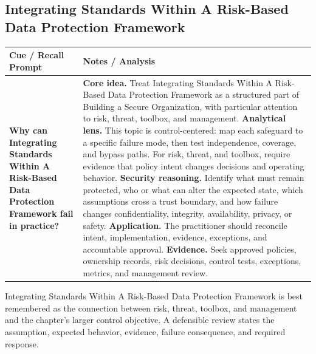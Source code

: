 \documentclass[11pt]{article}
\newcommand{\CornellHeader}{%
\rowcolor{Navy}\color{white}\bfseries Cue / Recall Prompt & \color{white}\bfseries Notes / Analysis\\\hline}
\newcommand{\CornellRow}[2]{%
\cellcolor{CueGray}\RaggedRight\textbf{#1} & \RaggedRight #2\\\hline}
\begin{document}
\subsection*{Integrating Standards Within A Risk-Based Data Protection Framework}
\begin{longtable}{>{\RaggedRight\arraybackslash}p{}|>{\RaggedRight\arraybackslash}p{}}
\CornellHeader
\CornellRow{Why can Integrating Standards Within A Risk-Based Data Protection Framework fail in practice?}{\textbf{Core idea.} Treat Integrating Standards Within A Risk-Based Data Protection Framework as a structured part of Building a Secure Organization, with particular attention to risk, threat, toolbox, and management. \textbf{Analytical lens.} This topic is control-centered: map each safeguard to a specific failure mode, then test independence, coverage, and bypass paths. For risk, threat, and toolbox, require evidence that policy intent changes decisions and operating behavior. \textbf{Security reasoning.} Identify what must remain protected, who or what can alter the expected state, which assumptions cross a trust boundary, and how failure changes confidentiality, integrity, availability, privacy, or safety. \textbf{Application.} The practitioner should reconcile intent, implementation, evidence, exceptions, and accountable approval. \textbf{Evidence.} Seek approved policies, ownership records, risk decisions, control tests, exceptions, metrics, and management review.}
\end{longtable}
\begin{topicsummary}
Integrating Standards Within A Risk-Based Data Protection Framework is best remembered as the connection between risk, threat, toolbox, and management and the chapter's larger control objective. A defensible review states the assumption, expected behavior, evidence, failure consequence, and required response.
\end{topicsummary}
\end{document}
